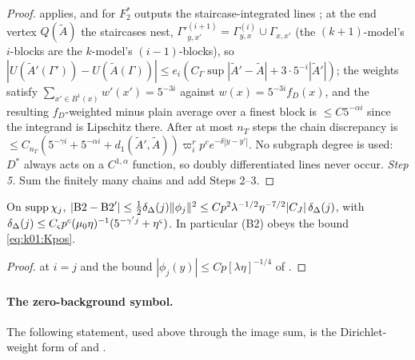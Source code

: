 \begin{proof}
\cite[(3.71)]{K1} applies, and for $F_2^*$ outputs the staircase-integrated lines \cite[(3.74)]{K1}; at the end vertex $Q(\tilde A)$ the staircases nest, $\Gamma'^{(i+1)}_{y,x'}=\Gamma^{(i)}_{y,x}\cup\Gamma_{x,x'}$ (the $(k+1)$-model's $i$-blocks are the $k$-model's $(i-1)$-blocks), so $|U(\tilde A'(\Gamma'))-U(\tilde A(\Gamma))|\le e_i(C_\Gamma\sup|\tilde A'-\tilde A|+3\cdot5^{-i}|\tilde A'|)$; the weights satisfy $\sum_{x'\in B^1(x)}w'(x')=5^{-3i}$ against $w(x)=5^{-3i}f_D(x)$, and the resulting $f_D$-weighted minus plain average over a finest block is $\le C5^{-\alpha i}$ since the integrand is Lipschitz there. After at most $n_T$ steps the chain discrepancy is $\le C_{n_T}(5^{-\gamma i}+5^{-\alpha i}+d_1(\tilde A',\tilde A))\varpi_i^rp^ce^{-\delta|y-y'|}$. No subgraph degree is used: $D^*$ always acts on a $C^{1,\alpha}$ function, so doubly differentiated lines never occur. \emph{Step 5.} Sum the finitely many chains and add Steps 2--3.
\end{proof}

\begin{corollary}[(B2)]\label{cor:a02:B2}
On $\operatorname{supp}\chi_j$, $|\mathrm{B2}-\mathrm{B2}'|\le\frac12\delta_\Delta(j)\lVert \phi_j\rVert^2\le Cp^2\lambda^{-1/2}\eta^{-7/2}|C_J|\,\delta_\Delta(j)$, with $\delta_\Delta(j)\le C_\varsigma p^c(\mu_0\eta)^{-1}(5^{-\gamma'j}+\eta^\varsigma)$. In particular (B2) obeys the bound \eqref{eq:k01:Kpos}.
\end{corollary}
\begin{proof}
 at $i=j$ and the bound $|\phi_j(y)|\le Cp[\lambda\eta]^{-1/4}$ of \cite[(3.2)]{K1}.
\end{proof}

\paragraph{The zero-background symbol.} The following statement, used above through the image sum, is the Dirichlet-weight form of \cite[Lemma~4.2, Prop.~3.10]{K1} and \cite[App.~A, (A.10)--(A.11)]{K2}.

